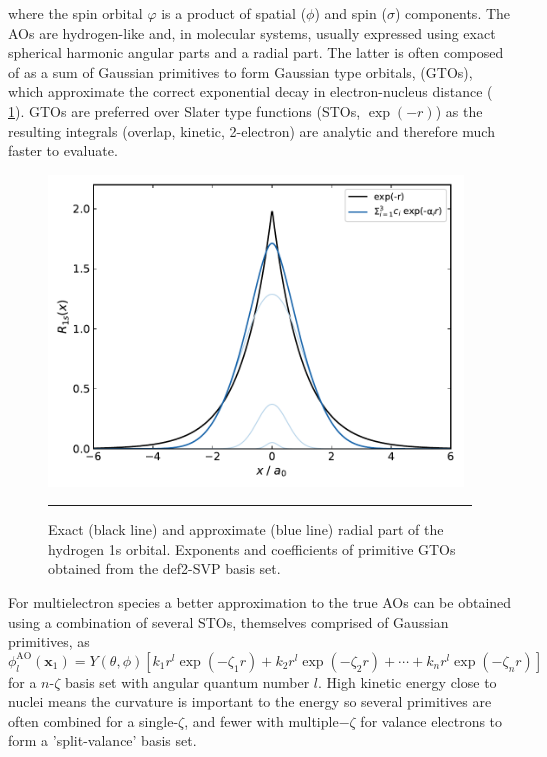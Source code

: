 \documentclass[main.tex]{subfiles}
\begin{document}
where the spin orbital $\varphi$ is a product of spatial ($\phi$) and spin ($\sigma$) components. The AOs are hydrogen-like and, in molecular systems, usually expressed using exact spherical harmonic angular parts and a radial part. The latter is often composed of as a sum of Gaussian primitives to form Gaussian type orbitals, (GTOs), which approximate the correct exponential decay in electron-nucleus distance (\figurename{ \ref{fig::gto_AO}}). GTOs are preferred over Slater type functions (STOs, $\exp(-r)$) as the resulting integrals (overlap, kinetic, 2-electron) are analytic and therefore much faster to evaluate. 

\begin{figure}[h!]
	\centering
	\includegraphics[width=11cm]{2/figs/fig1/gto_AO.pdf}
	\vspace{0.2cm}
	\hrule
	\caption{Exact (black line) and approximate (blue line) radial part of the hydrogen 1s orbital. Exponents and coefficients of primitive GTOs obtained from the def2-SVP basis set.\cite{BSE2019, Gulde2012}}
	\label{fig::gto_AO}
\end{figure}

For multielectron species a better approximation to the true AOs can be obtained using a combination of several STOs, themselves comprised of Gaussian primitives, as
\begin{equation}
	\phi_l^\text{AO}(\boldsymbol{x}_1) =  Y(\theta,\phi)[k_1 r^l \exp(-\zeta_1 r) + k_2 r^l \exp(-\zeta_2 r) + \cdots + k_n r^l \exp(-\zeta_n r)]
\end{equation}
for a $n$-$\zeta$ basis set with angular quantum number $l$. High kinetic energy close to nuclei means the curvature is important to the energy so several primitives are often combined for a single-$\zeta$, and fewer with multiple$-\zeta$ for valance electrons to form a 'split-valance' basis set.
\end{document}

